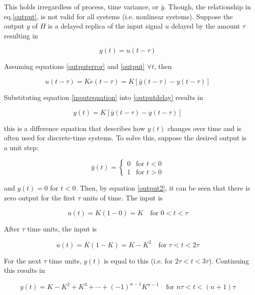 \documentclass[10pt]{article}
\begin{document}
This holds irregardless of process, time variance, or $\bar y$. Though, the relationship in eq.\ref{output}, is not valid for all systems (i.e. nonlinear systems). Suppose the output $y$ of $H$ is a delayed replica of the input signal $u$ delayed by the amount $\tau$ resulting in

\begin{equation}
    \label{outputdelay}
    y(t) = u(t-\tau)
\end{equation}

Assuming equations \ref{outputerror} and \ref{output} $\forall t$, then

\begin{equation}
    \label{inputequation}
    u(t-\tau) = Ke(t-\tau) = K\left[ \bar y(t-\tau) - y(t-\tau) \right]
\end{equation}

Substituting equation \ref{inputequation} into \ref{outputdelay} results in

\begin{equation}
    y(t) = K \left[ \bar y(t-\tau) - y(t-\tau) \right]
    \label{output2}
\end{equation}

\noindent this is a difference equation that describes how $y(t)$ changes over time and is often used for discrete-time systems. To solve this, suppose the desired output is a unit step:

\begin{equation}
    \bar y(t) =
    \begin{cases}
        0 & \text{for } t < 0 \\
        1 & \text{for } t > 0
    \end{cases}
\end{equation}

\noindent and $y(t) = 0$ for $t < 0$. Then, by equation \ref{output2}, it can be seen that there is zero output for the first $\tau$ units of time. The input is

$$
u(t) = K(1-0) = K \quad \text{for } 0<t<\tau
$$

After $\tau$ time units, the input is 

$$
u(t) = K(1-K) = K - K^2 \quad \text{for } \tau < t < 2\tau
$$

\noindent For the next $\tau$ time units, $y(t)$ is equal to this (i.e. for $2\tau < t < 3\tau$). Continuing this results in 

\begin{equation}
    y(t) = K - K^2 + K^3 + \cdots + (-1)^{n-1}K^{n-1} \quad \text{for } n\tau < t < (n+1)\tau
    \label{outputn}
\end{equation}
\end{document}
